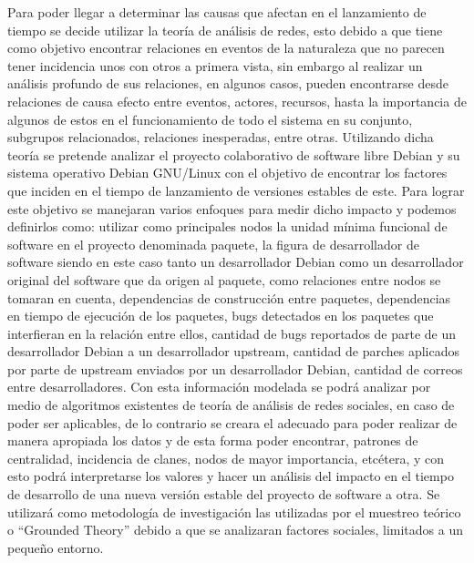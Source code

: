 \documentclass[12pt]{report}
\begin{document}
Para  poder  llegar  a  determinar   las  causas  que  afectan  en  el
lanzamiento  de tiempo  se decide  utilizar la  teoría de  análisis de
redes, esto debido  a que tiene como objetivo  encontrar relaciones en
eventos  de la  naturaleza que  no parecen  tener incidencia  unos con
otros a primera vista, sin embargo al realizar un análisis profundo de
sus relaciones, en algunos  casos, pueden encontrarse desde relaciones
de causa efecto entre eventos, actores, recursos, hasta la importancia
de algunos  de estos  en el  funcionamiento de todo  el sistema  en su
conjunto, subgrupos relacionados, relaciones inesperadas, entre otras.
Utilizando dicha teoría se  pretende analizar el proyecto colaborativo
de software libre  Debian y su sistema operativo  Debian GNU/Linux con
el objetivo  de encontrar  los factores  que inciden  en el  tiempo de
lanzamiento de versiones estables de  este.  Para lograr este objetivo
se  manejaran  varios enfoques  para  medir  dicho impacto  y  podemos
definirlos  como: utilizar  como  principales nodos  la unidad  mínima
funcional de software en el  proyecto denominada paquete, la figura de
desarrollador de software  siendo en este caso  tanto un desarrollador
Debian como  un desarrollador original  del software que da  origen al
paquete,   como  relaciones   entre  nodos   se  tomaran   en  cuenta,
dependencias de construcción entre paquetes, dependencias en tiempo de
ejecución  de  los  paquetes,  bugs detectados  en  los  paquetes  que
interfieran en la relación entre ellos, cantidad de bugs reportados de
parte de un desarrollador Debian  a un desarrollador upstream, cantidad
de  parches   aplicados  por  parte   de  upstream  enviados   por  un
desarrollador Debian, cantidad de  correos entre desarrolladores.  Con
esta información  modelada se podrá  analizar por medio  de algoritmos
existentes de teoría  de análisis de redes sociales, en  caso de poder
ser  aplicables, de  lo contrario  se  creara el  adecuado para  poder
realizar  de  manera  apropiada  los  datos  y  de  esta  forma  poder
encontrar,  patrones de  centralidad, incidencia  de clanes,  nodos de
mayor  importancia,  etcétera,  y  con esto  podrá  interpretarse  los
valores y hacer un análisis del  impacto en el tiempo de desarrollo de
una  nueva  versión estable  del  proyecto  de  software a  otra.   Se
utilizará  como metodología  de  investigación las  utilizadas por  el
muestreo  teórico o  ``Grounded Theory''  debido a  que se  analizaran
factores sociales, limitados a un pequeño entorno.
\end{document}

